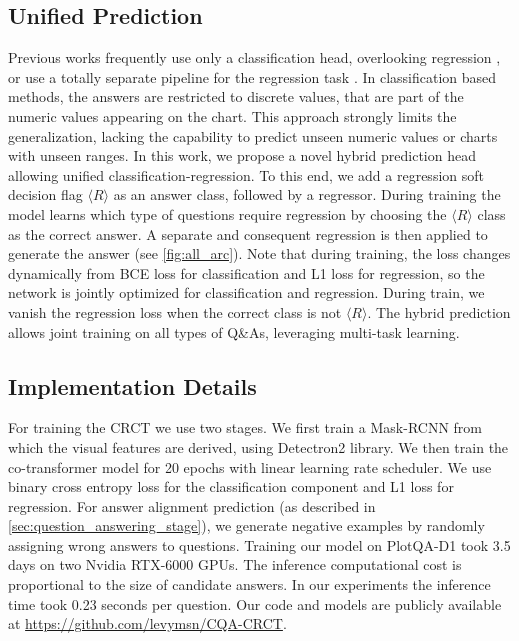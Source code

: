 \documentclass[runningheads]{llncs}
\newcommand\our[1][]{CRCT\xspace}
\begin{document}
\subsection{Unified Prediction}
\label{sec:hybrid_prediction}
Previous works frequently use only a classification head, overlooking regression \cite{figureqa,dvqa,chaudhry2019leafqa,chartqa}, or use a totally separate pipeline for the regression task \cite{plotqa}. In classification based methods, the answers are restricted to discrete values, that are part of the numeric values appearing on the chart. This approach strongly limits the generalization, lacking the capability to predict unseen numeric values or charts with unseen ranges. 
In this work, we propose a novel hybrid prediction head allowing unified classification-regression. To this end, we add a regression soft decision flag $\langle R \rangle$ as an answer class, followed by a regressor. During training the model learns which type of questions require regression by choosing the $\langle R \rangle$ class as the correct answer. A separate and consequent regression is then applied to generate the answer (see \cref{fig:all_arc}). Note that during training, the loss changes dynamically from BCE loss for classification and L1 loss for regression, so the network is jointly optimized for classification and regression. During train, we vanish the regression loss when the correct class is not $\langle R \rangle$. The hybrid prediction allows joint training on all types of Q\&As, leveraging multi-task learning. 

\subsection{Implementation Details}
For training the \our we use two stages. We first train a Mask-RCNN \cite{he2017mask} from which the visual features are derived, using Detectron2 \cite{wu2019detectron2} library. We then train the co-transformer model for 20 epochs with linear learning rate scheduler. We use binary cross entropy loss for the classification component and L1 loss for regression. For answer alignment prediction (as described in \cref{sec:question_answering_stage}), we generate negative examples by randomly assigning wrong answers to questions. Training our model on PlotQA-D1 took 3.5 days on two Nvidia RTX-6000 GPUs. The inference computational cost is proportional to the size of candidate answers. In our experiments the inference time took 0.23 seconds per question. Our code and models are publicly available at \href{https://github.com/levymsn/CQA-CRCT}{https://github.com/levymsn/CQA-CRCT}.
\end{document}
